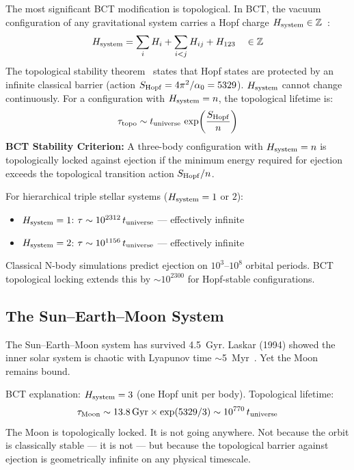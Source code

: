 \documentclass[twocolumn,10pt]{article}
\begin{document}
The most significant BCT modification is topological. In BCT, the vacuum configuration of any 
gravitational system carries a Hopf charge $H_{\rm system} \in \mathbb{Z}$~\cite{bct_jhapp}:
%
\begin{equation}
H_{\rm system} = \sum_i H_i + \sum_{i<j} H_{ij} + H_{123} \quad \in \mathbb{Z}
\end{equation}
%
The topological stability theorem~\cite{bct_l45} states that Hopf states are protected by an 
infinite classical barrier (action $S_{\rm Hopf} = 4\pi^2/\alpha_0 = 5329$). $H_{\rm system}$ 
cannot change continuously. For a configuration with $H_{\rm system} = n$, the topological 
lifetime is:
%
\begin{equation}
\tau_{\rm topo} \sim t_{\rm universe}\,\exp\!\left(\frac{S_{\rm Hopf}}{n}\right)
\end{equation}
%
\textbf{BCT Stability Criterion:} A three-body configuration with $H_{\rm system} = n$ is 
topologically locked against ejection if the minimum energy required for ejection exceeds 
the topological transition action $S_{\rm Hopf}/n$.

For hierarchical triple stellar systems ($H_{\rm system} = 1$ or $2$):
\begin{itemize}
\item $H_{\rm system} = 1$: $\tau \sim 10^{2312}\,t_{\rm universe}$ --- effectively infinite
\item $H_{\rm system} = 2$: $\tau \sim 10^{1156}\,t_{\rm universe}$ --- effectively infinite
\end{itemize}

Classical N-body simulations predict ejection on $10^3$--$10^8$ orbital periods. BCT topological 
locking extends this by $\sim 10^{2300}$ for Hopf-stable configurations.

\subsection{The Sun--Earth--Moon System}

The Sun--Earth--Moon system has survived 4.5~Gyr. Laskar (1994) showed the inner solar system 
is chaotic with Lyapunov time $\sim$5~Myr~\cite{laskar1994}. Yet the Moon remains bound. 

BCT explanation: $H_{\rm system} = 3$ (one Hopf unit per body). Topological lifetime:
%
\begin{equation}
\tau_{\rm Moon} \sim 13.8\,{\rm Gyr}\times\exp(5329/3) \sim 10^{770}\,t_{\rm universe}
\end{equation}
%
The Moon is topologically locked. It is not going anywhere. Not because the orbit is classically 
stable --- it is not --- but because the topological barrier against ejection is geometrically 
infinite on any physical timescale.
\end{document}
